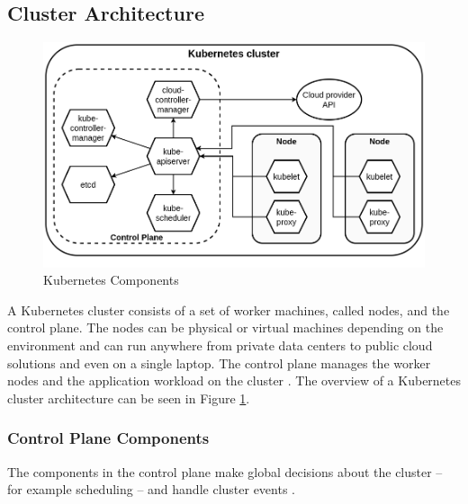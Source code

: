 \subsection{Cluster Architecture}

\begin{figure}[h]
	\centering
	\includegraphics[width=130mm, keepaspectratio]{figures/kubernetes_components.png}
	\caption{Kubernetes Components \cite{KubernetesArchitecture}}
	\label{fig:kubernetes_components}
\end{figure}


A Kubernetes cluster consists of a set of worker machines, called nodes, and the control plane. The nodes can be physical or virtual machines depending on the environment and can run anywhere from private data centers to public cloud solutions and even on a single laptop. The control plane manages the worker nodes and the application workload on the cluster \cite{KubernetesArchitecture}. The overview of a Kubernetes cluster architecture can be seen in Figure \ref{fig:kubernetes_components}.

\subsubsection{Control Plane Components} \label{background-kubernetes-control-plane}

The components in the control plane make global decisions about the cluster -- for example scheduling -- and handle cluster events \cite{KubernetesArchitecture}. 

